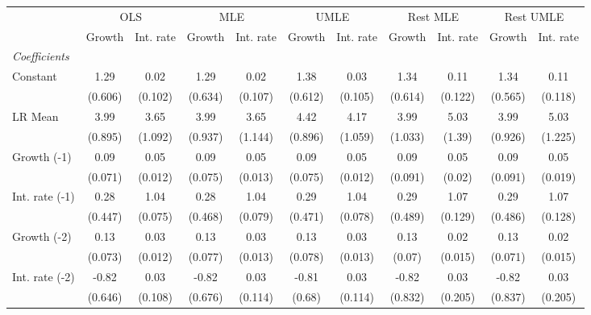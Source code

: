 \begin{table}[htbp] 
	\centering
	\begin{tabular}{@{\extracolsep{4pt}}lcccccccccc@{}}		\hline\hline
		 		 & \multicolumn{2}{c}{OLS} &\multicolumn{2}{c}{MLE} &\multicolumn{2}{c}{UMLE} &\multicolumn{2}{c}{Rest MLE} &\multicolumn{2}{c}{Rest UMLE} \\ 
 		 & Growth 	 & Int. rate 	 & Growth 	 & Int. rate 	 & Growth 	 & Int. rate 	 & Growth 	 & Int. rate 	 & Growth 	 & Int. rate\\\cline{2-3}\cline{4-5}\cline{6-7}\cline{8-9}\cline{10-11}
\rule{0pt}{4ex} 
 \emph{Coefficients} 	  		 & 		 & 		 & 		 & 		 & 		 & 		 & 		 & 		 & 		 &\\ 
\quad Constant 	 & 1.29 	 & 0.02 	 & 1.29 	 & 0.02 	 & 1.38 	 & 0.03 	 & 1.34 	 & 0.11 	 & 1.34 	 & 0.11	 \\ 
 		 & (0.606) 	 & (0.102) 	 & (0.634) 	 & (0.107) 	 & (0.612) 	 & (0.105) 	 & (0.614) 	 & (0.122) 	 & (0.565) 	 & (0.118) 	 \\ 
\quad LR Mean 	 & 3.99 	 & 3.65 	 & 3.99 	 & 3.65 	 & 4.42 	 & 4.17 	 & 3.99 	 & 5.03 	 & 3.99 	 & 5.03	 \\ 
 		 & (0.895) 	 & (1.092) 	 & (0.937) 	 & (1.144) 	 & (0.896) 	 & (1.059) 	 & (1.033) 	 & (1.39) 	 & (0.926) 	 & (1.225) 	 \\ 
\quad Growth (-1) 	 &0.09 	 & 0.05 	 & 0.09 	 & 0.05 	 & 0.09 	 & 0.05 	 & 0.09 	 & 0.05 	 & 0.09 	 & 0.05	 \\ 
 		 & (0.071) 	 & (0.012) 	 & (0.075) 	 & (0.013) 	 & (0.075) 	 & (0.012) 	 & (0.091) 	 & (0.02) 	 & (0.091) 	 & (0.019) 	 \\ 
\quad Int. rate (-1) 	 &0.28 	 & 1.04 	 & 0.28 	 & 1.04 	 & 0.29 	 & 1.04 	 & 0.29 	 & 1.07 	 & 0.29 	 & 1.07	 \\ 
 		 & (0.447) 	 & (0.075) 	 & (0.468) 	 & (0.079) 	 & (0.471) 	 & (0.078) 	 & (0.489) 	 & (0.129) 	 & (0.486) 	 & (0.128) 	 \\ 
\quad Growth (-2) 	 &0.13 	 & 0.03 	 & 0.13 	 & 0.03 	 & 0.13 	 & 0.03 	 & 0.13 	 & 0.02 	 & 0.13 	 & 0.02	 \\ 
 		 & (0.073) 	 & (0.012) 	 & (0.077) 	 & (0.013) 	 & (0.078) 	 & (0.013) 	 & (0.07) 	 & (0.015) 	 & (0.071) 	 & (0.015) 	 \\ 
\quad Int. rate (-2) 	 &-0.82 	 & 0.03 	 & -0.82 	 & 0.03 	 & -0.81 	 & 0.03 	 & -0.82 	 & 0.03 	 & -0.82 	 & 0.03	 \\ 
 		 & (0.646) 	 & (0.108) 	 & (0.676) 	 & (0.114) 	 & (0.68) 	 & (0.114) 	 & (0.832) 	 & (0.205) 	 & (0.837) 	 & (0.205) 	 \\ 

\end{tabular}
\end{table}
